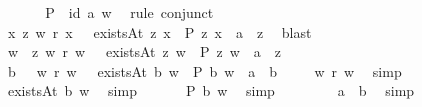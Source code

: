 \begin{isabellebody}
\ \ \isamarkupfalse%
\ {}\ \isamarkupfalse%
\ {\isachardoublequoteopen}{\isacharparenleft}\isactrlbold {\isasymnot}{\isacharparenleft}P\ {\isasymRrightarrow}\ id\ a{\isacharparenright}{\isacharparenright}\ w{\isachardoublequoteclose}\ \isamarkupfalse%
\ {\isacharparenleft}rule\ conjunct{}{\isacharparenright}\isanewline
\ \ \isamarkupfalse%
\ {\isachardoublequoteopen}{\isasymexists}x{\isachardot}\ {\isasymexists}z{\isachardot}\ w\ r\ x\ {\isasymand}\ \ existsAt\ z\ x\ {\isasymand}\ P\ z\ x\ {\isasymand}\ {\isasymnot}{\isacharparenleft}a\ {\isacharequal}\ z{\isacharparenright}{\isachardoublequoteclose}\ \isamarkupfalse%
\ blast\isanewline
\ \ \isamarkupfalse%
\ \isamarkupfalse%
\ w{}\ \ {\isachardoublequoteopen}{\isasymexists}z{\isachardot}\ w\ r\ w{}\ {\isasymand}\ \ existsAt\ z\ w{}\ {\isasymand}\ P\ z\ w{}\ {\isasymand}\ {\isasymnot}{\isacharparenleft}a\ {\isacharequal}\ z{\isacharparenright}{\isachardoublequoteclose}\ \isacommand{{\isachardot}{\isachardot}}\isamarkupfalse%
\isanewline
\ \ \isamarkupfalse%
\ \isamarkupfalse%
\ b\ \ {}{\isacharcolon}\ {\isachardoublequoteopen}w\ r\ w{}\ {\isasymand}\ \ existsAt\ b\ w{}\ {\isasymand}\ P\ b\ w{}\ {\isasymand}\ {\isasymnot}{\isacharparenleft}a\ {\isacharequal}\ b{\isacharparenright}{\isachardoublequoteclose}\ \isacommand{{\isachardot}{\isachardot}}\isamarkupfalse%
\isanewline
\ \ \isamarkupfalse%
\ {\isachardoublequoteopen}w\ r\ w{}{\isachardoublequoteclose}\ \isamarkupfalse%
\ simp\isanewline
\ \ \isamarkupfalse%
\ {}\ \isamarkupfalse%
\ {\isachardoublequoteopen}existsAt\ b\ w{}{\isachardoublequoteclose}\ \isamarkupfalse%
\ simp\isanewline
\ \ \isamarkupfalse%
\ {}\ \isamarkupfalse%
\ {\isachardoublequoteopen}P\ b\ w{}{\isachardoublequoteclose}\ \isamarkupfalse%
\ simp\isanewline
\ \ \isamarkupfalse%
\ {}\ \isamarkupfalse%
\ {}{\isacharcolon}\ {\isachardoublequoteopen}\ {\isasymnot}{\isacharparenleft}a\ {\isacharequal}\ b{\isacharparenright}{\isachardoublequoteclose}\ \isamarkupfalse%
\ simp\isanewline
\ \ \isamarkupfalse%
\ {}\ \isamarkupfalse%

\end{isabellebody}
